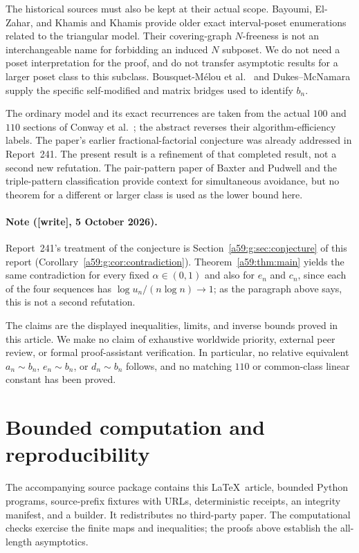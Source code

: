 \documentclass[11pt,letterpaper]{article}
\theoremstyle{remark}\newtheorem{remark}[theorem]{Remark}
\newcommand{\wtag}{\textup{[write]}}
\theoremstyle{remark}\newtheorem{wremark}{Remark}\renewcommand{\thewremark}{W\arabic{wremark}}
\theoremstyle{plain}\newtheorem{wcorollary}[wremark]{Corollary}
\begin{document}
The historical sources must also be kept at their actual scope. Bayoumi, El-Zahar, and Khamis \cite{bayoumi} and Khamis \cite{khamis} provide older exact interval-poset enumerations related to the triangular model. Their covering-graph $N$-freeness is not an interchangeable name for forbidding an induced $N$ subposet. We do not need a poset interpretation for the proof, and do not transfer asymptotic results for a larger poset class to this subclass. Bousquet-M\'elou et al.\ \cite{bcdk} and Dukes--McNamara \cite{dukes} supply the specific self-modified and matrix bridges used to identify $b_n$.

The ordinary model and its exact recurrences are taken from the actual $100$ and $110$ sections of Conway et al.\ \cite[Sections~2.3--2.4]{conway}; the abstract reverses their algorithm-efficiency labels. The paper's earlier fractional-factorial conjecture was already addressed in Report~241. The present result is a refinement of that completed result, not a second new refutation. The pair-pattern paper of Baxter and Pudwell \cite{baxter} and the triple-pattern classification \cite{callan} provide context for simultaneous avoidance, but no theorem for a different or larger class is used as the lower bound here.

\paragraph{Note (\wtag, 5 October 2026).} Report~241's treatment of the
conjecture is Section~\ref{a59:g:sec:conjecture} of this report
(Corollary~\ref{a59:g:cor:contradiction}). Theorem~\ref{a59:thm:main}
yields the same contradiction for every fixed $\alpha\in(0,1)$ and also for
$e_n$ and $c_n$, since each of the four sequences has
$\log u_n/(n\log n)\to1$; as the paragraph above says, this is not a second
refutation.

The claims are the displayed inequalities, limits, and inverse bounds proved in this article. We make no claim of exhaustive worldwide priority, external peer review, or formal proof-assistant verification. In particular, no relative equivalent $a_n\sim b_n$, $e_n\sim b_n$, or $d_n\sim b_n$ follows, and no matching $110$ or common-class linear constant has been proved.
\section{Bounded computation and reproducibility}\label{a59:sec:computation}
The accompanying source package contains this \LaTeX\ article, bounded Python programs, source-prefix fixtures with URLs, deterministic receipts, an integrity manifest, and a builder. It redistributes no third-party paper. The computational checks exercise the finite maps and inequalities; the proofs above establish the all-length asymptotics.
\end{document}

